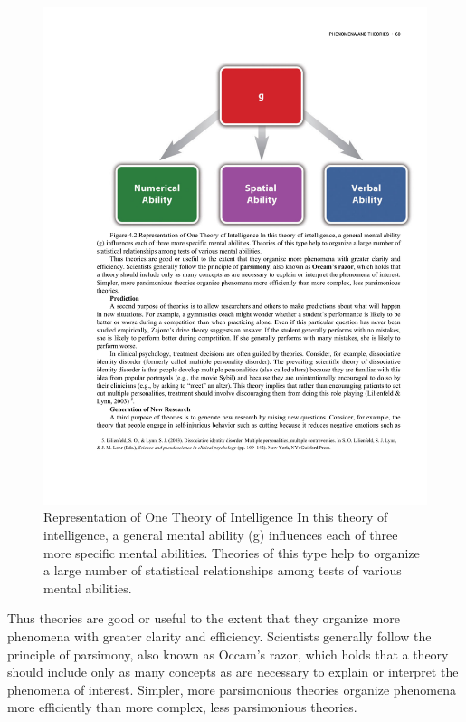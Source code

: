 \begin{figure}

      \includegraphics[width=\linewidth]{figures/C4Intelligence.pdf}

      \caption{Representation of One Theory of Intelligence In this theory of intelligence, a general mental ability (g) influences each of three more specific mental abilities. Theories of this type help to organize a large number of statistical relationships among tests of various mental abilities.
}

      \label{fig:Intelligence}

\end{figure}

Thus theories are good or useful to the extent that they organize more phenomena with greater clarity and efficiency. Scientists generally follow the principle of parsimony, also known as Occam's razor, which holds that a theory should include only as many concepts as are necessary to explain or interpret the phenomena of interest. Simpler, more parsimonious theories organize phenomena more efficiently than more complex, less parsimonious theories.

